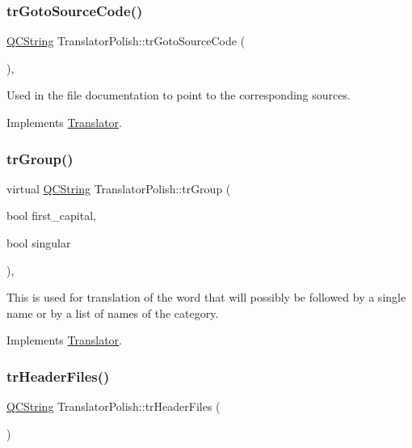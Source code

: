 \subsubsection{\texorpdfstring{trGotoSourceCode()}{trGotoSourceCode()}}
{\footnotesize\ttfamily \mbox{\hyperlink{class_q_c_string}{Q\+C\+String}} Translator\+Polish\+::tr\+Goto\+Source\+Code (\begin{DoxyParamCaption}{ }\end{DoxyParamCaption})\hspace{0.3cm}{\ttfamily [inline]}, {\ttfamily [virtual]}}

Used in the file documentation to point to the corresponding sources. 

Implements \mbox{\hyperlink{class_translator}{Translator}}.

\mbox{\label{class_translator_polish_a2a432d8fddb8ae68fe3f85d78bb06943}} 
\subsubsection{\texorpdfstring{trGroup()}{trGroup()}}
{\footnotesize\ttfamily virtual \mbox{\hyperlink{class_q_c_string}{Q\+C\+String}} Translator\+Polish\+::tr\+Group (\begin{DoxyParamCaption}\item[{bool}]{first\+\_\+capital,  }\item[{bool}]{singular }\end{DoxyParamCaption})\hspace{0.3cm}{\ttfamily [inline]}, {\ttfamily [virtual]}}

This is used for translation of the word that will possibly be followed by a single name or by a list of names of the category. 

Implements \mbox{\hyperlink{class_translator}{Translator}}.

\mbox{\label{class_translator_polish_a748d9793a3a011afa12158c3a4d63f8e}} 
\subsubsection{\texorpdfstring{trHeaderFiles()}{trHeaderFiles()}}
{\footnotesize\ttfamily \mbox{\hyperlink{class_q_c_string}{Q\+C\+String}} Translator\+Polish\+::tr\+Header\+Files (\begin{DoxyParamCaption}{ }\end{DoxyParamCaption})\hspace{0.3cm}{\ttfamily [inline]}}

